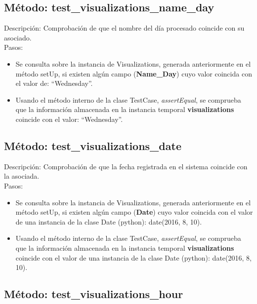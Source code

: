 

\subsection{\quad Método: test\_visualizations\_name\_day}

Descripción: Comprobación de que el nombre del día procesado coincide con su asociado.\\
Pasos:
\begin{itemize}
\item Se consulta sobre la instancia de Visualizations, generada anteriormente en el método setUp, si existen algún campo (\textbf{Name\_Day}) cuyo valor coincida con el valor de: ``Wednesday''.
\item Usando el método interno de la clase TestCase, \emph{assertEqual}, se comprueba que la información almacenada en la instancia temporal \textbf{visualizations} coincide con el valor: ``Wednesday''.
\end{itemize}



\subsection{\quad Método: test\_visualizations\_date}

Descripción: Comprobación de que la fecha registrada en el sistema coincide con la asociada.\\
Pasos:
\begin{itemize}
\item Se consulta sobre la instancia de Visualizations, generada anteriormente en el método setUp, si existen algún campo (\textbf{Date}) cuyo valor coincida con el valor de una instancia de la clase Date (python): date(2016, 8, 10).
\item Usando el método interno de la clase TestCase, \emph{assertEqual}, se comprueba que la información almacenada en la instancia temporal \textbf{visualizations} coincide con el valor de una instancia de la clase Date (python): date(2016, 8, 10).
\end{itemize}



\subsection{\quad Método: test\_visualizations\_hour}

